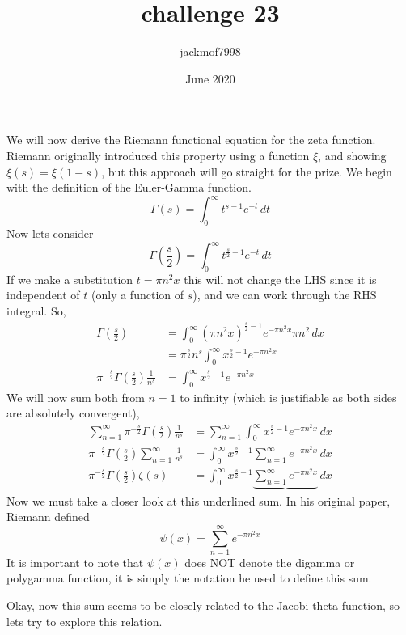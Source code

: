\documentclass{article}
\title{challenge 23}
\author{jackmof7998 }
\date{June 2020}
\begin{document}
We will now derive the Riemann functional equation for the zeta function. Riemann originally introduced this property using a function $\xi$, and showing $\xi(s)=\xi(1-s)$, but this approach will go straight for the prize. We begin with the definition of the Euler-Gamma function. 
\begin{equation*}
\Gamma(s)=\int_{0}^{\infty}t^{s-1}e^{-t}\,dt 
\end{equation*}
Now lets consider 
\begin{equation*}
\Gamma\left(\frac{s}{2}\right)=\int_{0}^{\infty}t^{\frac{s}{2}-1}e^{-t}\,dt 
\end{equation*}
If we make a substitution $t=\pi n^2 x$ this will not change the LHS since it is independent of $t$ (only a function of $s$), and we can work through the RHS integral. So,
\begin{equation*}
    \begin{split}
        \Gamma\left(\frac{s}{2}\right)&=\int_{0}^{\infty} (\pi n^2 x)^{\frac{s}{2}-1}e^{-\pi n^2 x}\pi n^2 \, dx\\
        &=\pi^{\frac{s}{2}}n^s\int_{0}^{\infty} x^{\frac{s}{2}-1}e^{-\pi n^2 x}\\
       \pi^{-\frac{s}{2}}\Gamma\left(\frac{s}{2}\right)\frac{1}{n^s}&=\int_{0}^{\infty} x^{\frac{s}{2}-1}e^{-\pi n^2 x}
    \end{split}
\end{equation*}
We will now sum both from $n=1$ to infinity (which is justifiable as both sides are absolutely convergent), 
\begin{equation}
\begin{split}
    \sum_{n=1}^{\infty} \pi^{-\frac{s}{2}}\Gamma\left(\frac{s}{2}\right)\frac{1}{n^s}&= \sum_{n=1}^{\infty}\int_{0}^{\infty} x^{\frac{s}{2}-1}e^{-\pi n^2 x}\,dx\\
    \pi^{-\frac{s}{2}}\Gamma\left(\frac{s}{2}\right)  \sum_{n=1}^{\infty}\frac{1}{n^s}&=\int_{0}^{\infty}  x^{\frac{s}{2}-1}\sum_{n=1}^{\infty}e^{-\pi n^2 x}\,dx\\
    \pi^{-\frac{s}{2}}\Gamma\left(\frac{s}{2}\right) \zeta(s)&=\int_{0}^{\infty}  x^{\frac{s}{2}-1}\underbrace{\sum_{n=1}^{\infty}e^{-\pi n^2 x}}\,dx
    \end{split}
\end{equation}
Now we must take a closer look at this underlined sum. In his original paper, Riemann defined
\begin{equation*}
    \psi(x)=\sum_{n=1}^{\infty}e^{-\pi n^2 x}
\end{equation*}
It is important to note that $\psi(x)$ does NOT denote the digamma or polygamma function, it is simply the notation he used to define this sum.  \par Okay, now this sum seems to be closely related to the Jacobi theta function, so lets try to explore this relation. 
\end{document}
